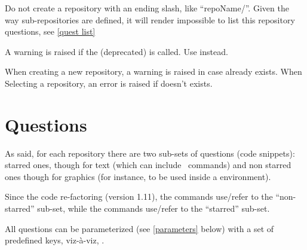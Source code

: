 \documentclass[10pt]{article}
\begin{document}
\begin{tsremark}
Do not create a repository with an ending slash, like ``repoName/''. Given the way sub-repositories are defined, it will render impossible to list this repository questions, see \ref{quest list}
\end{tsremark}


\begin{tsremark}
  A warning is raised if the (deprecated)  is called. Use  instead.
\end{tsremark}

\begin{tsremark}
When creating a new repository, a warning is raised  in case  already exists. 
When Selecting a repository, an error is raised if  doesn't exists.
\end{tsremark}


\section{Questions}
As said, for each repository there are two sub-sets of questions (code snippets): starred ones, though for text (which can include \LaTeXe\ commands) and non starred ones though for graphics (for instance, to be used inside a  environment). 

Since the code re-factoring (version 1.11), the commands  use/refer to the ``non-starred'' sub-set, while the commands  use/refer to the ``starred'' sub-set.

 All questions can be parameterized (see \ref{parameters} below) with a set of predefined keys, viz-à-viz, .
\end{document}

